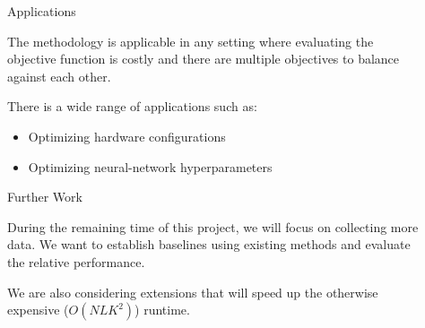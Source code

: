 \documentclass[final]{beamer}
\newlength{\sepwid}
\newlength{\onecolwid}
\newlength{\twocolwid}
\begin{document}
\begin{frame}[t]
\begin{columns}[t]
\begin{column}{\twocolwid}

\end{column} %

\begin{column}{\sepwid}\end{column} %

\begin{column}{\onecolwid} %


\begin{block}{Applications}

The methodology is applicable in any setting where evaluating the objective function is costly and there are multiple objectives to balance against each other.

There is a wide range of applications such as:

\begin{itemize}
\item Optimizing hardware configurations
\item Optimizing neural-network hyperparameters
\end{itemize}

\end{block}


\begin{block}{Further Work}

During the remaining time of this project, we will focus on collecting more data. We want to establish baselines using existing methods and evaluate the relative performance.

We are also considering extensions that will speed up the otherwise expensive ($O(NLK^2)$) runtime.

\end{block}



\end{column}
\end{columns}
\end{frame}
\end{document}
